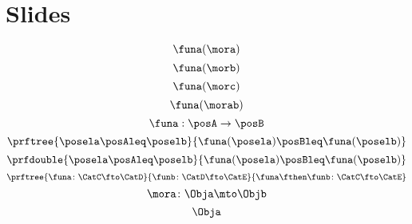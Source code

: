 
\section{Slides}



    \begin{forslides}
    
              \begin{equation}
            \label{eq:slides_Ff}
            \funa(\mora)
        \end{equation}
        \begin{equation}
            \label{eq:slides_Fg}
            \funa(\morb)
        \end{equation}
        \begin{equation}
            \label{eq:slides_Fh}
            \funa(\morc)
        \end{equation}
        \begin{equation}
            \label{eq:slides_Ffg}
            \funa(\morab)
        \end{equation}
        \begin{equation}
            \label{eq:mono1}
            \funa: \posA \to \posB
        \end{equation}
        \begin{equation}
            \label{eq:mono2}
            \prftree{\posela \posAleq \poselb}{\funa(\posela) \posBleq \funa(\poselb)}
        \end{equation}
        \begin{equation}
            \label{eq:mono3}
            \prfdouble{\posela \posAleq \poselb}{\funa(\posela) \posBleq \funa(\poselb)}
        \end{equation}
        \begin{equation}
            \label{eq:functor-composition1}
            \prftree{\funa\colon \CatC \fto \CatD}{\funb\colon\CatD\fto\CatE}{\funa\fthen\funb\colon \CatC \fto \CatE}
        \end{equation}
        \begin{equation}
            \label{eq:slides_mora}
            \mora\colon \Obja\mto\Objb
        \end{equation}
        \begin{equation}
            \label{eq:slides_mora_obja}
            \Obja
        \end{equation}
        \begin{equation}

\end{equation}
\end{forslides}
